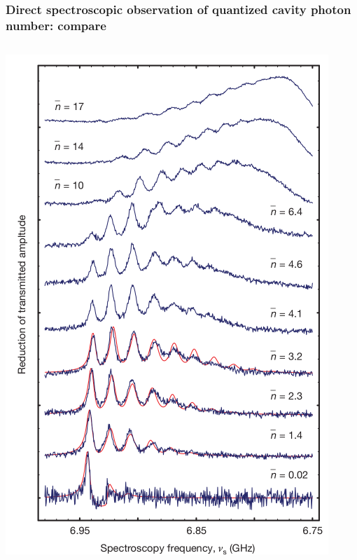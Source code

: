 \documentclass[xcolor=dvipsnames,hyperref={CJKbookmarks=true}]{beamer}
\begin{document}
\begin{frame}[t]\frametitle{Direct spectroscopic observation of quantized cavity photon number: compare}
\begin{columns}
\begin{column}{0.35\linewidth}
    \centering
    \includegraphics[width=\linewidth]{sweaping_origin.pdf}
\end{column}%
\begin{column}{0.65\linewidth}
	\centering

\end{column}
\end{columns}
\end{frame}
\end{document}
